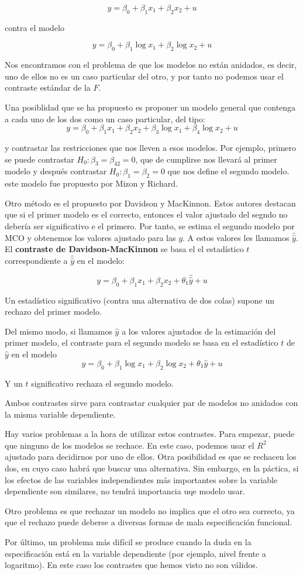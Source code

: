 \[y=\beta_0+\beta_1x_1+\beta_2x_2+u\]

contra el modelo

\[y=\beta_0+\beta_1\log{x_1}+\beta_2\log{x_2}+u\]

Nos encontramos con el problema de que los modelos no est\'an anidados, es decir, uno de ellos no es un caso particular del otro, y por tanto no podemos usar el contraste est\'andar de la $F$.

Una posiblidad que se ha propuesto es proponer un modelo general que contenga a cada uno de los dos como un caso particular, del tipo:
\[y=\beta_0+\beta_1x_1+\beta_2x_2+\beta_3\log{x_1}+\beta_4\log{x_2}+u\]

y contrastar las restricciones que nos lleven a esos modelos. Por ejemplo, primero se puede contrastar $H_0:\beta_3=\beta_42=0$, que de cumplirse nos llevar\'a al primer modelo y despu\'es contrastar $H_0:\beta_1=\beta_2=0$ que nos define el segundo modelo. este modelo fue propuesto por Mizon y Richard.

Otro m\'etodo es el propuesto por Davidson y MacKinnon. Estos autores destacan que si el primer modelo es el correcto, entonces el valor ajustado del segndo no deber\'ia ser significativo e el primero. Por tanto, se estima el segundo modelo por MCO y obtenemos los valores ajustado para las $y$. A estos valores les llamamos $\hat{\hat{y}}$. El \textbf{contraste de Davidson-MacKinnon} se basa el el estad\'istico $t$ correspondiente a $\hat{\hat{y}}$ en el modelo:

\[y=\beta_0+\beta_1x_1+\beta_2x_2+\theta_1\hat{\hat{y}}+u\]
 
Un estad\'istico significativo (contra una alternativa de dos colas) supone un rechazo del primer modelo.

Del mismo modo, si llamamos $\hat{y}$ a los valores ajustados de la estimaci\'on del primer modelo, el contraste para el segundo modelo se basa en el estad\'istico $t$ de $\hat{y}$ en el modelo
\[y=\beta_0+\beta_1\log{x_1}+\beta_2\log{x_2}+\theta_1\hat{y}+u\]

Y un $t$ significativo rechaza el segundo modelo.

Ambos contrastes sirve para contrastar cualquier par de modelos no anidados con la misma variable dependiente.

Hay varios problemas a la hora de utilizar estos contrastes. Para empezar, puede que ninguno de los modelos se rechace. En este caso, podemos usar el $R^2$ ajustado para decidirnos por uno de ellos. Otra posibilidad es que se rechacen los dos, en cuyo caso habr\'a que buscar una alternativa. Sin embargo, en la p\'actica, si los efectos de las variables independientes m\'as importantes sobre la variable dependiente son similares, no tendr\'a importancia uqe modelo usar.

Otro problema es que rechazar un modelo no implica que el otro sea correcto, ya que el rechazo puede deberse a diversas formas de mala especificaci\'on funcional.

Por \'ultimo, un problema m\'as dif\'icil se produce cuando la duda en la especificaci\'on est\'a en la variable dependiente (por ejemplo, nivel frente a logaritmo). En este caso los contrastes que hemos visto no son v\'alidos.
